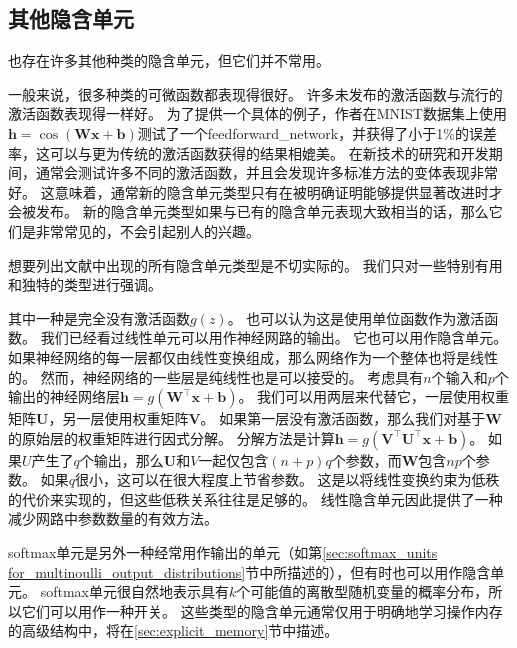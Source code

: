 \subsection{其他隐含单元}
\label{sec:other_hidden_units}

也存在许多其他种类的隐含单元，但它们并不常用。

一般来说，很多种类的可微函数都表现得很好。
许多未发布的激活函数与流行的激活函数表现得一样好。
为了提供一个具体的例子，作者在MNIST数据集上使用$\bm{h}=\cos(\bm{W}\bm{x}+\bm{b})$测试了一个\gls{feedforward_network}，并获得了小于1\%的误差率，这可以与更为传统的激活函数获得的结果相媲美。
在新技术的研究和开发期间，通常会测试许多不同的激活函数，并且会发现许多标准方法的变体表现非常好。
这意味着，通常新的隐含单元类型只有在被明确证明能够提供显著改进时才会被发布。
新的隐含单元类型如果与已有的隐含单元表现大致相当的话，那么它们是非常常见的，不会引起别人的兴趣。

想要列出文献中出现的所有隐含单元类型是不切实际的。
我们只对一些特别有用和独特的类型进行强调。

其中一种是完全没有激活函数$g(z)$。
也可以认为这是使用单位函数作为激活函数。
我们已经看过线性单元可以用作神经网路的输出。
它也可以用作隐含单元。
如果神经网络的每一层都仅由线性变换组成，那么网络作为一个整体也将是线性的。
然而，神经网络的一些层是纯线性也是可以接受的。
考虑具有$n$个输入和$p$个输出的神经网络层$\bm{h}=g(\bm{W}^\top \bm{x}+\bm{b})$。
我们可以用两层来代替它，一层使用权重矩阵$\bm{U}$，另一层使用权重矩阵$\bm{V}$。
如果第一层没有激活函数，那么我们对基于$\bm{W}$的原始层的权重矩阵进行因式分解。
分解方法是计算$\bm{h}=g(\bm{V}^\top \bm{U}^\top \bm{x}+\bm{b})$。
如果$U$产生了$q$个输出，那么$\bm{U}$和$V$一起仅包含$(n+p)q$个参数，而$\bm{W}$包含$np$个参数。
如果$q$很小，这可以在很大程度上节省参数。
这是以将线性变换约束为低秩的代价来实现的，但这些低秩关系往往是足够的。
线性隐含单元因此提供了一种减少网路中参数数量的有效方法。


softmax单元是另外一种经常用作输出的单元（如第\ref{sec:softmax_units for_multinoulli_output_distributions}节中所描述的），但有时也可以用作隐含单元。
softmax单元很自然地表示具有$k$个可能值的离散型随机变量的概率分布，所以它们可以用作一种开关。
这些类型的隐含单元通常仅用于明确地学习操作内存的高级结构中，将在\ref{sec:explicit_memory}节中描述。

